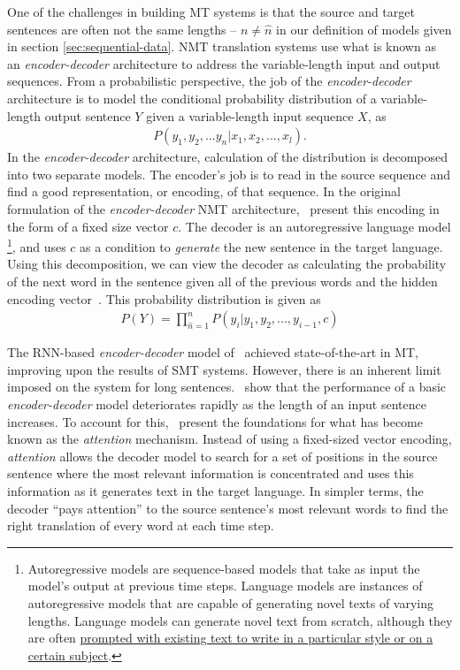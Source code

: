 \newcommand{\ed}{\emph{encoder-decoder}}
One of the challenges in building MT systems is that the source and target sentences are often not the same lengths -- $n \neq \hat{n}$ in our definition of \seq{} models given in section \ref{sec:sequential-data}. NMT translation systems use what is known as an \ed{} architecture to address the variable-length input and output sequences. From a probabilistic perspective, the job of the \ed{} architecture is to model the conditional probability distribution of a variable-length output sentence $Y$ given a variable-length input sequence $X$, as
\begin{align*}
P(y_1, y_2, ... y_n | x_1, x_2, ..., x_l). 
\end{align*}
In the \ed{} architecture, calculation of the distribution is decomposed into two separate models. The encoder's job is to read in the source sequence and find a good representation, or encoding, of that sequence. In the original formulation of the \ed{} NMT architecture,~\citet{cho2014learning} present this encoding in the form of a fixed size vector $c$. The decoder is an autoregressive language model%
\footnote{Autoregressive models are sequence-based models that take as input the model's output at previous time steps. Language models are instances of autoregressive models that are capable of generating novel texts of varying lengths. Language models can generate novel text from scratch, although they are often \href{https://transformer.huggingface.co/doc/distil-gpt2}{prompted with existing text to write in a particular style or on a certain subject}.}, and uses $c$ as a condition to \emph{generate} the new sentence in the target language. Using this decomposition, we can view the decoder as calculating the probability of the next word in the sentence given all of the previous words and the hidden encoding vector~\cite{bahdanau2014neural}. This probability distribution is given as
\begin{align*}
P(Y) = \prod_{\hat{n}=1}^{n}P(y_i \vert y_1, y_2, ..., y_{i-1}, c)    
\end{align*}


\newcommand{\at}[1]{\emph{#1}}

The RNN-based \ed{} model of~\citet{cho2014learning} achieved state-of-the-art in MT, improving upon the results of SMT systems. However, there is an inherent limit imposed on the system for long sentences.~\citet{cho2014learning} show that the performance of a basic \ed{} model deteriorates rapidly as the length of an input sentence increases. To account for this,~\citet{bahdanau2014neural} present the foundations for what has become known as the \at{attention} mechanism. Instead of using a fixed-sized vector encoding, \at{attention} allows the decoder model to search for a set of positions in the source sentence where the most relevant information is concentrated and uses this information as it generates text in the target language. In simpler terms, the decoder ``pays attention'' to the source sentence's most relevant words to find the right translation of every word at each time step. 

